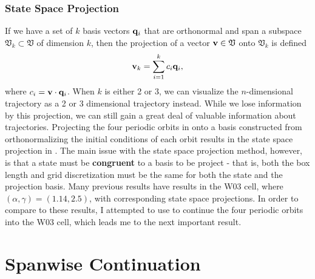 \subsubsection{State Space Projection}
If we have a set of $k$ basis vectors $\mathbf{q}_i$ that are orthonormal and span a subspace $\mathfrak{V}_k \subset \mathfrak{V}$ of dimension $k$, then the projection of a vector $\mathbf{v} \in \mathfrak{V}$ onto $\mathfrak{V}_k$ is defined 
\begin{equation}
\Vector{v}_k = \sum{i = 1}{k}{c_i \Vector{q}_i},
\end{equation}
where $c_i = \mathbf{v} \cdot \mathbf{q}_i$. When $k$ is either 2 or 3, we can visualize the $n$-dimensional trajectory as a 2 or 3 dimensional trajectory instead. While we lose information by this projection, we can still gain a great deal of valuable information about trajectories. Projecting the four periodic orbits in  onto a basis constructed from orthonormalizing the initial conditions of each orbit results in the state space projection in . The main issue with the state space projection method, however, is that a state must be {\bf congruent} to a basis to be project - that is, both the box length and grid discretization must be the same for both the state and the projection basis. Many previous results have results in the W03 cell, where $(\alpha,\gamma) = (1.14,2.5)$, with corresponding state space projections. In order to compare to these results, I attempted to use  to continue the four periodic orbits into the W03 cell, which leads me to the next important result.

\section{Spanwise Continuation}

